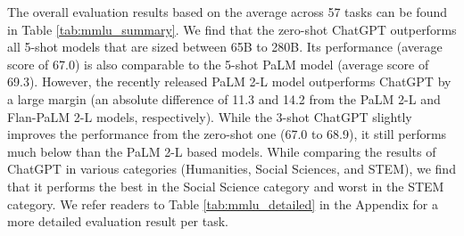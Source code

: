 \documentclass[11pt]{article}
\begin{document}
The overall evaluation results based on the average across 57 tasks can be found in Table \ref{tab:mmlu_summary}. We find that the zero-shot ChatGPT outperforms all 5-shot models that are sized between 65B to 280B. Its performance (average score of 67.0) is also comparable to the 5-shot PaLM model (average score of 69.3). However, the recently released PaLM 2-L model outperforms ChatGPT by a large margin (an absolute difference of 11.3 and 14.2 from the PaLM 2-L and Flan-PaLM 2-L models, respectively). While the 3-shot ChatGPT slightly improves the performance from the zero-shot one (67.0 to 68.9), it still performs much below than the PaLM 2-L based models. While comparing the results of ChatGPT in various categories (Humanities, Social Sciences, and STEM), we find that it performs the best in the Social Science category and worst in the STEM category. We refer readers to Table \ref{tab:mmlu_detailed} in the Appendix for a more detailed evaluation result per task.
    
\end{document}

